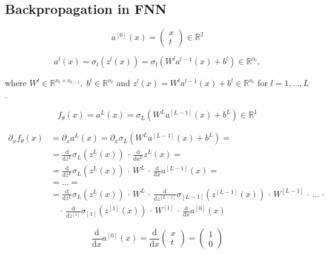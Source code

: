 \subsection{Backpropagation in FNN}

\begin{equation*}
    a^{[0]}(x) = \begin{pmatrix} x \\ t \end{pmatrix} \in \mathbb{R}^2
\end{equation*}

\begin{equation*}
    a^{l}(x) = \sigma_{l} (z^{l}(x)) = \sigma_{l} (W^{l} a^{l-1}(x) + b^{l}) \in \mathbb{R}^{n_l}, 
\end{equation*}

where $W^{l} \in \mathbb{R}^{n_l \times n_{l-1}}, \; b^{l} \in \mathbb{R}^{n_l}$ and $z^{l}(x) = W^{l} a^{l-1}(x) + b^{l} \in \mathbb{R}^{n_l}$ for $l = 1, \ldots, L$.

\begin{equation*}
    f_{\theta}(x) = a^{L}(x) = \sigma_{L} (W^{L} a^{[L-1]}(x) + b^{L}) \in \mathbb{R}^{1} 
\end{equation*}

\begin{align*}
    \partial_x f_{\theta}(x) & =  \partial_x a^{L}(x) = \partial_x \sigma_{L} (W^{L} a^{[L-1]}(x) + b^{L}) = \\
    & =  \frac{\mathrm{d}}{\mathrm{d} z^{L}} \sigma_{L} (z^{L}(x)) \, \cdot \, \frac{\mathrm{d}}{\mathrm{d} a^{L}} z^{L}(x) = \\ 
    & =  \frac{\mathrm{d}}{\mathrm{d} z^{L}} \sigma_{L} (z^{L}(x)) \, \cdot \, W^{L} \, \cdot \, \frac{\mathrm{d}}{\mathrm{d} x} a^{[L-1]}(x) = \\
    & =  \ldots = \\
    & =  \frac{\mathrm{d}}{\mathrm{d} z^{L}} \sigma_{L} (z^{L}(x)) \, \cdot \, W^{L} \, \cdot \, \frac{\mathrm{d}}{\mathrm{d} z^{[L-1]}} \sigma_{[L-1]} (z^{[L-1]}(x)) \, \cdot \, W^{[L-1]} \, \cdot \, \ldots \, \cdot \\
    & \quad \cdot \, \frac{\mathrm{d}}{\mathrm{d} z^{[1]}} \sigma_{[1]} (z^{[1]}(x)) \, \cdot \, W^{[1]} \, \cdot \,\frac{\mathrm{d}}{\mathrm{d} x} a^{[0]}(x) 
\end{align*}
    
\begin{equation*}
    \frac{\mathrm{d}}{\mathrm{d} x} a^{[0]}(x) = \frac{\mathrm{d}}{\mathrm{d} x} \begin{pmatrix} x \\ t \end{pmatrix} = \begin{pmatrix} 1 \\ 0 \end{pmatrix}
\end{equation*}

